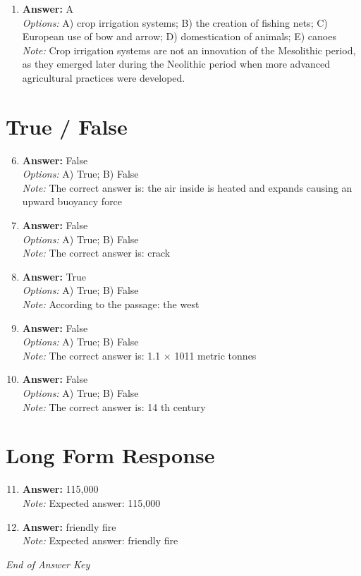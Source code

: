 \documentclass[12pt]{article}
\begin{document}
\begin{enumerate}[label=\arabic*.]
\\ \textit{Note:} The correct answer is supported by the fact that the recovery of an intentionally engraved shell at the Trinil site indicates that Homo erectus may have engaged in symbolic expression, suggesting the presence of an aesthetic sense and the potential for artistic creation.
\item \textbf{Answer:} A
\\ \textit{Options:} A) crop irrigation systems; B) the creation of fishing nets; C) European use of bow and arrow; D) domestication of animals; E) canoes
\\ \textit{Note:} Crop irrigation systems are not an innovation of the Mesolithic period, as they emerged later during the Neolithic period when more advanced agricultural practices were developed.
\end{enumerate}

\section*{True / False}
\begin{enumerate}[label=\arabic*.]
\setcounter{enumi}{5}
\item \textbf{Answer:} False
\\ \textit{Options:} A) True; B) False
\\ \textit{Note:} The correct answer is: the air inside is heated and expands causing an upward buoyancy force
\item \textbf{Answer:} False
\\ \textit{Options:} A) True; B) False
\\ \textit{Note:} The correct answer is: crack
\item \textbf{Answer:} True
\\ \textit{Options:} A) True; B) False
\\ \textit{Note:} According to the passage: the west
\item \textbf{Answer:} False
\\ \textit{Options:} A) True; B) False
\\ \textit{Note:} The correct answer is: 1.1 \ensuremath{\times} 1011 metric tonnes
\item \textbf{Answer:} False
\\ \textit{Options:} A) True; B) False
\\ \textit{Note:} The correct answer is: 14 th century
\end{enumerate}

\section*{Long Form Response}
\begin{enumerate}[label=\arabic*.]
\setcounter{enumi}{10}
\item \textbf{Answer:} 115,000
\\ \textit{Note:} Expected answer: 115,000
\item \textbf{Answer:} friendly fire
\\ \textit{Note:} Expected answer: friendly fire
\end{enumerate}

\vfill
\noindent\textit{End of Answer Key}
\end{document}
